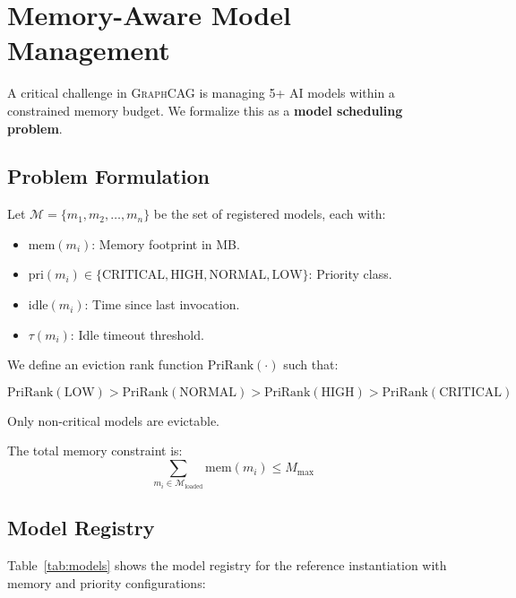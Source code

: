 \documentclass[11pt,a4paper,twocolumn]{article}
\newcommand{\graphcag}{\textsc{GraphCAG}}
\begin{document}
\section{Memory-Aware Model Management}
\label{sec:memory}

A critical challenge in \graphcag{} is managing 5+ AI models within a constrained memory budget. We formalize this as a \textbf{model scheduling problem}.

\subsection{Problem Formulation}

Let $\mathcal{M} = \{m_1, m_2, \ldots, m_n\}$ be the set of registered models, each with:
\begin{itemize}[leftmargin=*]
  \item $\text{mem}(m_i)$: Memory footprint in MB.
  \item $\text{pri}(m_i) \in \{\text{CRITICAL},\text{HIGH},\text{NORMAL},\text{LOW}\}$: Priority class.
  \item $\text{idle}(m_i)$: Time since last invocation.
  \item $\tau(m_i)$: Idle timeout threshold.
\end{itemize}

We define an eviction rank function $\text{PriRank}(\cdot)$ such that:

\begin{equation}
\text{PriRank}(\text{LOW}) > \text{PriRank}(\text{NORMAL}) > \text{PriRank}(\text{HIGH}) > \text{PriRank}(\text{CRITICAL})
\end{equation}

\noindent Only non-critical models are evictable.

The total memory constraint is:
\begin{equation}
\sum_{m_i \in \mathcal{M}_\text{loaded}} \text{mem}(m_i) \leq M_\text{max}
\end{equation}

\subsection{Model Registry}

Table~\ref{tab:models} shows the model registry for the reference instantiation with memory and priority configurations:
\end{document}
